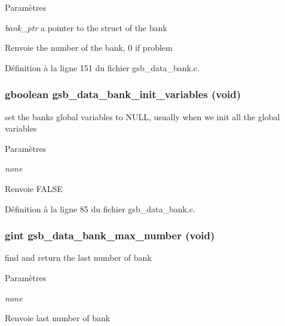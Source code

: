 \begin{DoxyParams}{Paramètres}
\item[{\em bank\_\-ptr}]a pointer to the struct of the bank\end{DoxyParams}
\begin{DoxyReturn}{Renvoie}
the number of the bank, 0 if problem 
\end{DoxyReturn}


Définition à la ligne 151 du fichier gsb\_\-data\_\-bank.c.

\subsubsection[{gsb\_\-data\_\-bank\_\-init\_\-variables}]{\setlength{\rightskip}{0pt plus 5cm}gboolean gsb\_\-data\_\-bank\_\-init\_\-variables (void)}\label{gsb__data__bank_8c_ae5ffeaf39ec5866843d17f2f001e9eb9}
set the banks global variables to NULL, usually when we init all the global variables


\begin{DoxyParams}{Paramètres}
\item[{\em none}]\end{DoxyParams}
\begin{DoxyReturn}{Renvoie}
FALSE 
\end{DoxyReturn}


Définition à la ligne 85 du fichier gsb\_\-data\_\-bank.c.

\subsubsection[{gsb\_\-data\_\-bank\_\-max\_\-number}]{\setlength{\rightskip}{0pt plus 5cm}gint gsb\_\-data\_\-bank\_\-max\_\-number (void)}\label{gsb__data__bank_8c_a6c219326668f89af5254d7ab57af0448}
find and return the last number of bank


\begin{DoxyParams}{Paramètres}
\item[{\em none}]\end{DoxyParams}
\begin{DoxyReturn}{Renvoie}
last number of bank 
\end{DoxyReturn}


